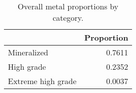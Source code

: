 \begin{table}
\centering
\caption{Overall metal proportions by category.}
\label{tab:ehg_metal_prop}
\begin{tabular}{lr}
\toprule
{} &  Proportion \\
\midrule
Mineralized        &      0.7611 \\
High grade         &      0.2352 \\
Extreme high grade &      0.0037 \\
\bottomrule
\end{tabular}
\end{table}

